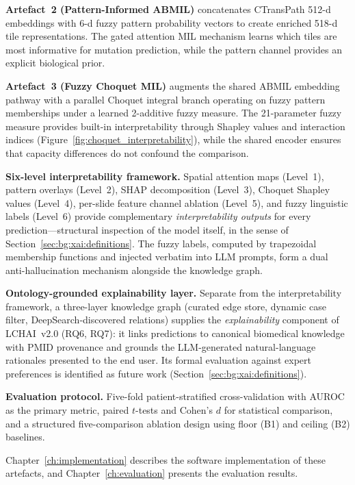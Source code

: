\textbf{Artefact~2 (Pattern-Informed ABMIL)} concatenates CTransPath
512-d embeddings with 6-d fuzzy pattern probability vectors to create
enriched 518-d tile representations.
The gated attention MIL mechanism learns which tiles are most
informative for mutation prediction, while the pattern channel provides
an explicit biological prior.

\textbf{Artefact~3 (Fuzzy Choquet MIL)} augments the shared ABMIL
embedding pathway with a parallel Choquet integral branch operating on
fuzzy pattern memberships under a learned 2-additive fuzzy measure.
The 21-parameter fuzzy measure provides built-in interpretability
through Shapley values and interaction indices
(Figure~\ref{fig:choquet_interpretability}), while the shared encoder
ensures that capacity differences do not confound the comparison.

\textbf{Six-level interpretability framework.}
Spatial attention maps (Level~1), pattern overlays (Level~2), SHAP
decomposition (Level~3), Choquet Shapley values (Level~4), per-slide
feature channel ablation (Level~5), and fuzzy linguistic labels
(Level~6) provide complementary \emph{interpretability outputs} for
every prediction---structural inspection of the model itself, in
the sense of Section~\ref{sec:bg:xai:definitions}.
The fuzzy labels, computed by trapezoidal membership functions and
injected verbatim into LLM prompts, form a dual anti-hallucination
mechanism alongside the knowledge graph.

\textbf{Ontology-grounded explainability layer.}
Separate from the interpretability framework, a three-layer
knowledge graph (curated edge store, dynamic case filter,
DeepSearch-discovered relations) supplies the
\emph{explainability} component of LCHAI~v2.0 (RQ6, RQ7): it
links predictions to canonical biomedical knowledge with PMID
provenance and grounds the LLM-generated natural-language
rationales presented to the end user.
Its formal evaluation against expert
preferences is identified as future work
(Section~\ref{sec:bg:xai:definitions}).

\textbf{Evaluation protocol.}
Five-fold patient-stratified cross-validation with AUROC as the
primary metric, paired $t$-tests and Cohen's $d$ for statistical
comparison, and a structured five-comparison ablation design using
floor (B1) and ceiling (B2) baselines.

Chapter~\ref{ch:implementation} describes the software implementation
of these artefacts, and Chapter~\ref{ch:evaluation} presents the
evaluation results.
